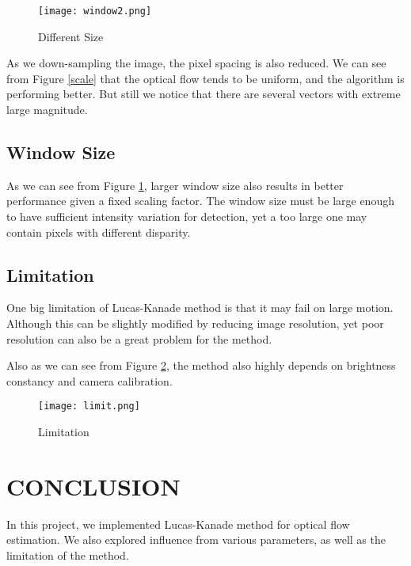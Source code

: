 \documentclass[letterpaper, 10 pt, conference]{ieeeconf}
\begin{document}
\clearpage

\begin{figure}[thpb]
\centering
\texttt{[image: window2.png]}
\caption{Different Size}
\label{window}
\end{figure}



As we down-sampling the image, the pixel spacing is also reduced. We can see from Figure \ref{scale} that the optical flow tends to be uniform, and the algorithm is performing better. But still we notice that there are several vectors with extreme large magnitude.



\subsection{Window Size}
As we can see from Figure \ref{window}, larger window size also results in better performance given a fixed scaling factor. 
\newpage
The window size must be large enough to have sufficient intensity variation for detection, yet a too large one may contain pixels with different disparity.



\subsection{Limitation}
One big limitation of Lucas-Kanade method is that it may fail on large motion. Although this can be slightly modified by reducing image resolution, yet poor resolution can also be a great problem for the method.

Also as we can see from Figure \ref{limit}, the method also highly depends on brightness constancy and camera calibration.

\begin{figure}[thpb]
\centering
\texttt{[image: limit.png]}
\caption{Limitation}
\label{limit}
\end{figure}
\section{CONCLUSION}
In this project, we implemented Lucas-Kanade method for optical flow estimation. We also explored influence from various parameters, as well as the limitation of the method.
\vfill
\end{document}
